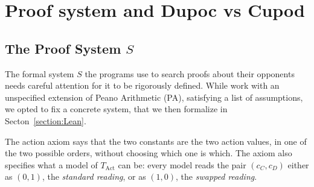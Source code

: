 \documentclass[twoside,11pt]{article}
\begin{document}
\newpage

\section{Proof system and Dupoc vs Cupod}















\subsection{The Proof System $S$}\label{subsection:Theory-SystemS}

The formal system $S$ the programs use to search proofs about their opponents needs careful attention for it to be rigorously defined. While \citet[Appendix~B]{Critch} work with an unspecified extension of Peano Arithmetic (PA), satisfying a list of assumptions, we opted to fix a concrete system, that we then formalize in Secton~\ref{section:Lean}.


The action axiom says that the two constants are the two action values, in one of the two possible orders, without choosing which one is which. The axiom also specifies what a model of $T_{\mathrm{Act}}$ can be: every model reads the pair $(c_C, c_D)$ either as $(0,1)$, the \emph{standard reading}, or as $(1,0)$, the \emph{swapped reading}.
\end{document}
